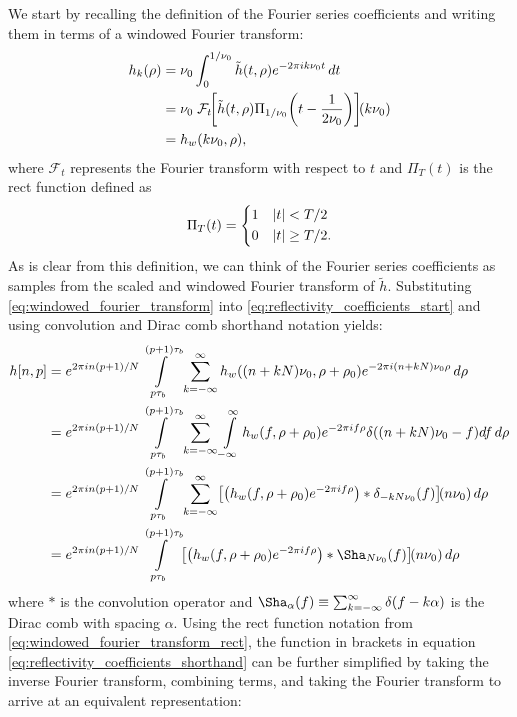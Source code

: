 We start by recalling the definition of the Fourier series coefficients and writing them in terms of a windowed Fourier transform:
\begin{align}
 h_k(\rho) &= \nu_0 \int_{0}^{1/\nu_0} \tilde{h}(t, \rho) e^{-2\pi i k\nu_0 t} \dee{t}\\
 &= \nu_0 \; \mathcal{F}_t \!\brak*{ \tilde{h}(t, \rho) \Pi_{1/\nu_0}\paren*{t - \frac{1}{2\nu_0}} }\!(k\nu_0) \label{eq:windowed_fourier_transform_rect}\\
 &= h_w(k\nu_0, \rho) \label{eq:windowed_fourier_transform},
\end{align}
where $\mathcal{F}_t$ represents the Fourier transform with respect to $t$ and $\Pi_{T}(t)$ is the rect function defined as
\begin{equation}
 \Pi_{T}(t) = \begin{dcases}
                  1 & \lvert t\rvert < T/2\\
                  0 & \lvert t\rvert \ge T/2.
                 \end{dcases}
\end{equation}
As is clear from this definition, we can think of the Fourier series coefficients as samples from the scaled and windowed Fourier transform of $\tilde{h}$. Substituting \eqref{eq:windowed_fourier_transform} into \eqref{eq:reflectivity_coefficients_start} and using convolution and Dirac comb shorthand notation yields:
\begin{align}
 h[n,p] &= e^{2 \pi i n(p+1)/N} \int\limits_{p\tau_b}^{(p+1)\tau_b} \sum_{k = -\infty}^{\infty} h_w((n + kN)\nu_0, \rho + \rho_0) e^{-2\pi i (n + kN)\nu_0\rho} \dee\rho\nonumber\\
 &= e^{2 \pi i n(p+1)/N} \int\limits_{p\tau_b}^{(p+1)\tau_b} \sum_{k = -\infty}^{\infty} \int\limits_{-\infty}^{\infty} h_w(f, \rho + \rho_0) e^{-2\pi i f\rho} \delta((n + kN)\nu_0 - f) df \dee\rho\nonumber\\
 &= e^{2 \pi i n(p+1)/N} \int\limits_{p\tau_b}^{(p+1)\tau_b} \sum_{k = -\infty}^{\infty} \brak*{\paren*{h_w(f, \rho + \rho_0) e^{-2\pi i f\rho}} * \delta_{-kN\nu_0}(f)}\!(n\nu_0) \dee\rho\nonumber\\
 &= e^{2 \pi i n(p+1)/N} \int\limits_{p\tau_b}^{(p+1)\tau_b} \brak*{\paren*{h_w(f, \rho + \rho_0) e^{-2\pi i f\rho}} * \Sha_{N\nu_0}(f)}\!(n\nu_0) \dee\rho \label{eq:reflectivity_coefficients_shorthand}
\end{align}
where $*$ is the convolution operator and $\Sha_\alpha(f) \equiv \sum_{k = -\infty}^{\infty} \delta(f - k\alpha)$ is the Dirac comb with spacing $\alpha$. Using the rect function notation from \eqref{eq:windowed_fourier_transform_rect}, the function in brackets in equation \eqref{eq:reflectivity_coefficients_shorthand} can be further simplified by taking the inverse Fourier transform, combining terms, and taking the Fourier transform to arrive at an equivalent representation:
